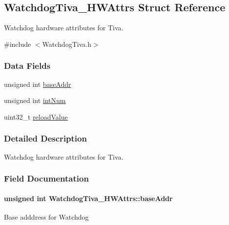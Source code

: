 \subsection{Watchdog\-Tiva\-\_\-\-H\-W\-Attrs Struct Reference}
\label{struct_watchdog_tiva___h_w_attrs}


Watchdog hardware attributes for Tiva.  




{\ttfamily \#include $<$Watchdog\-Tiva.\-h$>$}

\subsubsection*{Data Fields}
\begin{DoxyCompactItemize}
\item 
unsigned int \hyperlink{struct_watchdog_tiva___h_w_attrs_a68961f02d0b68c1a2f47d44a610d2798}{base\-Addr}
\item 
unsigned int \hyperlink{struct_watchdog_tiva___h_w_attrs_aebd70848c54717c57475a01618a68f50}{int\-Num}
\item 
uint32\-\_\-t \hyperlink{struct_watchdog_tiva___h_w_attrs_a89674a9a8537a33a7e5ef4b94ac8f5e4}{reload\-Value}
\end{DoxyCompactItemize}


\subsubsection{Detailed Description}
Watchdog hardware attributes for Tiva. 

\subsubsection{Field Documentation}
\paragraph[{base\-Addr}]{\setlength{\rightskip}{0pt plus 5cm}unsigned int Watchdog\-Tiva\-\_\-\-H\-W\-Attrs\-::base\-Addr}\label{struct_watchdog_tiva___h_w_attrs_a68961f02d0b68c1a2f47d44a610d2798}
Base adddress for Watchdog 
